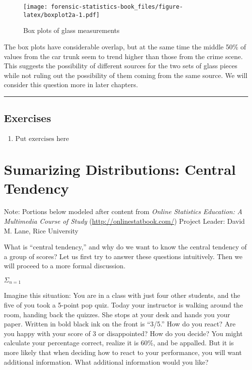 \documentclass[
]{book}
\providecommand{\tightlist}{%
  \setlength{\itemsep}{0pt}\setlength{\parskip}{0pt}}
\begin{document}
\begin{figure}
\centering
\texttt{[image: forensic-statistics-book\_files/figure-latex/boxplot2a-1.pdf]}
\caption{\label{fig:boxplot2a}Box plots of glass measurements}
\end{figure}

The box plots have considerable overlap, but at the same time the middle 50\%
of values from the car trunk seem to trend higher than those from the crime
scene. This suggests the possibility of different sources for the two sets
of glass pieces while not ruling out the possibility of them coming from the
same source. We will consider this question more in later chapters.

\begin{center}\rule{0.5\linewidth}{0.5pt}\end{center}

\hypertarget{exercises-5}{%
\section{Exercises}\label{exercises-5}}

\begin{enumerate}
\def\labelenumi{\arabic{enumi}.}
\tightlist
\item
  \(\text{Put exercises here}\)
\end{enumerate}

\hypertarget{sumarizing-distributions-central-tendency}{%
\chapter{Sumarizing Distributions: Central Tendency}\label{sumarizing-distributions-central-tendency}}

Note: Portions below modeled after content from
\emph{Online Statistics Education: A Multimedia Course of Study}
(\url{http://onlinestatbook.com/}) Project Leader: David M. Lane, Rice University

What is ``central tendency,'' and why do we want to know the central tendency of a group of scores? Let us first try to answer these questions intuitively. Then we will proceed to a more formal discussion.

\(\Sigma_{n=1}\)

Imagine this situation: You are in a class with just four other students, and the five of you took a 5-point pop quiz. Today your instructor is walking around the room, handing back the quizzes. She stops at your desk and hands you your paper. Written in bold black ink on the front is ``3/5.'' How do you react? Are you happy with your score of 3 or disappointed? How do you decide? You might calculate your percentage correct, realize it is 60\%, and be appalled. But it is more likely that when deciding how to react to your performance, you will want additional information. What additional information would you like?
\end{document}
